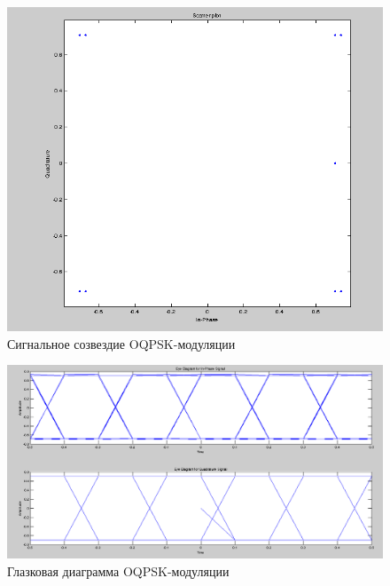 \begin{figure}[H]
\includegraphics[width=150mm, scale = 0.9]{lab9/9_9}
   \caption{Сигнальное созвездие OQPSK-модуляции}
\end{figure}



\begin{figure}[H]
\includegraphics[width=150mm, scale = 0.9]{lab9/9_10}
   \caption{Глазковая диаграмма OQPSK-модуляции}
\end{figure}



